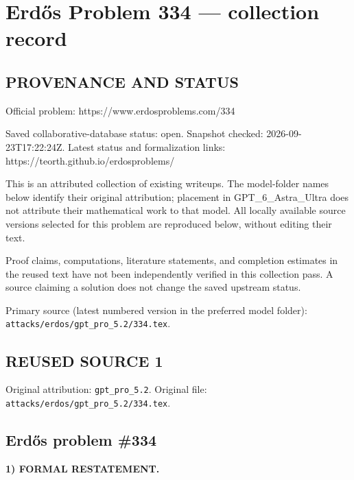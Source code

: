 \section*{Erd\H{o}s Problem 334 --- collection record}

\subsection*{PROVENANCE AND STATUS}
Official problem: https://www.erdosproblems.com/334

Saved collaborative-database status: open.
Snapshot checked: 2026-09-23T17:22:24Z.
Latest status and formalization links: https://teorth.github.io/erdosproblems/

This is an attributed collection of existing writeups. The model-folder names below identify their original attribution; placement in GPT\_6\_Astra\_Ultra does not attribute their mathematical work to that model. All locally available source versions selected for this problem are reproduced below, without editing their text.

Proof claims, computations, literature statements, and completion estimates in the reused text have not been independently verified in this collection pass. A source claiming a solution does not change the saved upstream status.

Primary source (latest numbered version in the preferred model folder): \texttt{attacks/erdos/gpt\_pro\_5.2/334.tex}.

\subsection*{REUSED SOURCE 1}
Original attribution: \texttt{gpt\_pro\_5.2}.
Original file: \texttt{attacks/erdos/gpt\_pro\_5.2/334.tex}.


\subsection*{Erd\H{o}s problem \#334}

\noindent\textbf{1) FORMAL RESTATEMENT.}

